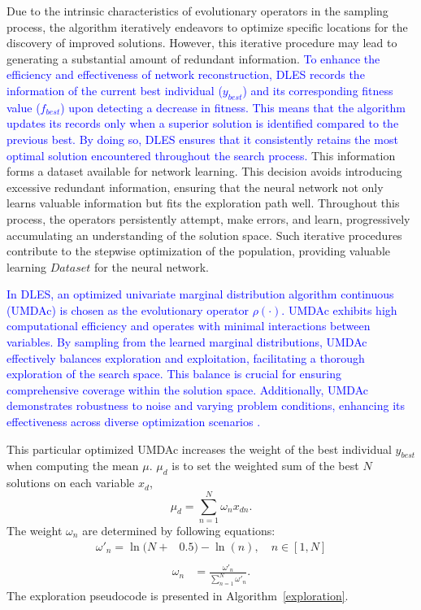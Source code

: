 \documentclass[journal,twoside]{IEEEtran}
\begin{document}
Due to the intrinsic characteristics of evolutionary operators in the sampling process, the algorithm iteratively endeavors to optimize specific locations for the discovery of improved solutions. However, this iterative procedure may lead to generating a substantial amount of redundant information. \textcolor{blue}{To enhance the efficiency and effectiveness of network reconstruction, DLES records the information of the current best individual ($y_{best}$) and its corresponding fitness value ($f_{best}$) upon detecting a decrease in fitness. This means that the algorithm updates its records only when a superior solution is identified compared to the previous best. By doing so, DLES ensures that it consistently retains the most optimal solution encountered throughout the search process.} This information forms a dataset available for network learning. This decision avoids introducing excessive redundant information, ensuring that the neural network not only learns valuable information but fits the exploration path well. Throughout this process, the operators persistently attempt, make errors, and learn, progressively accumulating an understanding of the solution space. Such iterative procedures contribute to the stepwise optimization of the population, providing valuable learning $Dataset$ for the neural network.

\textcolor{blue}{
In DLES, an optimized univariate marginal distribution algorithm continuous (UMDAc) \cite{10247259} is chosen as the evolutionary operator $\rho(\cdot)$. UMDAc exhibits high computational efficiency and operates with minimal interactions between variables. By sampling from the learned marginal distributions, UMDAc effectively balances exploration and exploitation, facilitating a thorough exploration of the search space. This balance is crucial for ensuring comprehensive coverage within the solution space. Additionally, UMDAc demonstrates robustness to noise and varying problem conditions, enhancing its effectiveness across diverse optimization scenarios \cite{8790358}.}

This particular optimized UMDAc increases the weight of the best individual $y_{best}$ when computing the mean $\mu$. $\mu_{d}$ is to set the weighted sum of the best $N$ solutions on each variable $x_{d}$,
\begin{equation}
	\mu_{d} = \sum_{n=1}^{N} \omega_{n}x_{dn}.
\end{equation}
The weight $\omega_{n}$ are determined by following equations:
\begin{equation}
	\begin{aligned}
		\omega'_{n} = \ln(N + &0.5)-\ln(n), \quad n \in [1, N] \\
	\end{aligned}
\end{equation}
\begin{equation}
	\begin{aligned}
		\omega_{n} &= \frac{\omega'_{n}}{\sum_{n = 1}^N \omega'_{n}}.
	\end{aligned}
\end{equation}
The exploration pseudocode is presented in Algorithm~\ref{exploration}.
\end{document}
